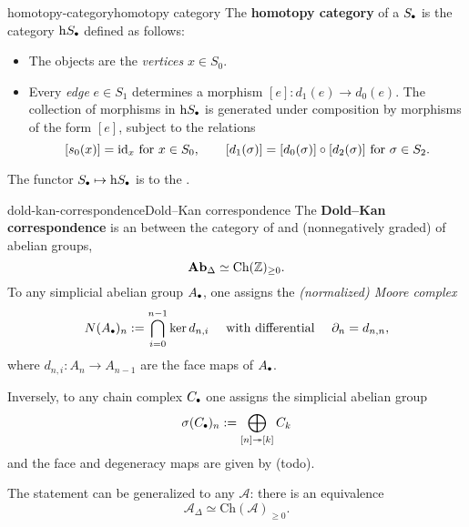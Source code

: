 \begin{topic}{homotopy-category}{homotopy category}
    The \textbf{homotopy category} of a  $S_\bdot$ is the category $\text{h}S_\bdot$ defined as follows:
    \begin{itemize}
        \item The objects are the \textit{vertices} $x \in S_0$.
        \item Every \textit{edge} $e \in S_1$ determines a morphism $[e] : d_1(e) \to d_0(e)$. The collection of morphisms in $\text{h}S_\bdot$ is generated under composition by morphisms of the form $[e]$, subject to the relations
        \[ [s_0(x)] = \text{id}_x \text{ for } x \in S_0, \qquad [d_1(\sigma)] = [d_0(\sigma)] \circ [d_2(\sigma)] \text{ for } \sigma \in S_2 . \]
    \end{itemize}
    
    The functor $S_\bdot \mapsto \text{h}S_\bdot$ is  to the .
\end{topic}

\begin{topic}{dold-kan-correspondence}{Dold--Kan correspondence}
    The \textbf{Dold--Kan correspondence} is an  between the category of   and (nonnegatively graded)  of abelian groups,
    \[ \textbf{Ab}_\Delta \simeq \text{Ch}(\mathbb{Z})_{\ge 0} . \]
    To any simplicial abelian group $A_\bdot$, one assigns the \textit{(normalized) Moore complex}
    \[ N(A_\bdot)_n := \bigcap_{i = 0}^{n - 1} \ker d_{n, i} \quad \text{ with differential } \quad \partial_n = d_{n, n}, \]
    where $d_{n, i} : A_n \to A_{n - 1}$ are the face maps of $A_\bdot$.
    
    Inversely, to any chain complex $C_\bdot$ one assigns the simplicial abelian group
    \[ \sigma(C_\bdot)_n := \bigoplus_{[n] \twoheadrightarrow [k]} C_k \]
    and the face and degeneracy maps are given by (todo).
    
    The statement can be generalized to any  $\mathcal{A}$: there is an equivalence
    \[ \mathcal{A}_\Delta \simeq \text{Ch}(\mathcal{A})_{\ge 0} . \]
\end{topic}

